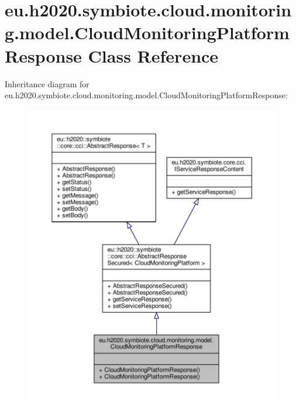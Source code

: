 \hypertarget{classeu_1_1h2020_1_1symbiote_1_1cloud_1_1monitoring_1_1model_1_1CloudMonitoringPlatformResponse}{}\section{eu.\+h2020.\+symbiote.\+cloud.\+monitoring.\+model.\+Cloud\+Monitoring\+Platform\+Response Class Reference}
\label{classeu_1_1h2020_1_1symbiote_1_1cloud_1_1monitoring_1_1model_1_1CloudMonitoringPlatformResponse}


Inheritance diagram for eu.\+h2020.\+symbiote.\+cloud.\+monitoring.\+model.\+Cloud\+Monitoring\+Platform\+Response\+:
\nopagebreak
\begin{figure}[H]
\begin{center}
\leavevmode
\includegraphics[width=350pt]{classeu_1_1h2020_1_1symbiote_1_1cloud_1_1monitoring_1_1model_1_1CloudMonitoringPlatformResponse__inherit__graph}
\end{center}
\end{figure}


